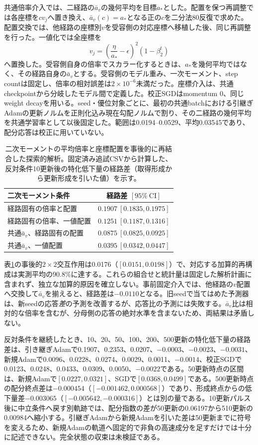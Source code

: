 共通倍率介入では、二経路の$\bar a_v$の幾何平均を目標$a_\ast$とした。配置を保つ再調整では各座標を$c v_j$へ置き換え、$\bar a_v(c)=a_\ast$となる正の$c$を二分法80反復で求めた。配置交換では、他経路の座標別$v$を受容側の対応座標へ移植した後、同じ再調整を行った。一値化では全座標を
\begin{equation}
v_j=\left(\frac{\eta}{a_\ast}-\epsilon\right)^2(1-\beta_2^t)
\end{equation}
へ置換した。受容側自身の倍率でスカラー化するときは、$a_\ast$を幾何平均ではなく、その経路自身の$\bar a_v$とする。受容側のモデル重み、一次モーメント、step countは固定し、倍率の相対誤差は$2\times10^{-6}$未満だった。座標介入は、共通checkpointから分岐したモデル間で定義した。校正SGDはmomentum 0、同じweight decayを用いる。seed・優位対象ごとに、最初の共通batchにおける引継ぎAdamの更新ノルムを正則化込み現在勾配ノルムで割り、その二経路の幾何平均を共通学習率として以後固定した。範囲は0.0194--0.0529、平均0.03545であり、配分応答は校正に用いていない。

\begin{table}[h]
\centering\small
\caption{二次モーメントの平均倍率と座標配置を事後的に再結合した探索的解析。固定済み追試CSVから計算した、反対条件10更新後の特化低下量の経路差（取得形成から更新形成を引いた値）を示す。}
\label{tab:vdecomp}
\begin{tabular}{lc}
\toprule
二次モーメント条件 & 経路差 $[95\%\ \mathrm{CI}]$\\
\midrule
経路固有の倍率と配置 & $0.1907\ [0.1835,0.1975]$\\
経路固有の倍率、一値配置 & $0.1251\ [0.1187,0.1316]$\\
共通$\bar a_v$、経路固有の配置 & $0.0875\ [0.0825,0.0925]$\\
共通$\bar a_v$、一値配置 & $0.0395\ [0.0342,0.0447]$\\
\bottomrule
\end{tabular}
\end{table}

表\ref{tab:vdecomp}の事後的$2\times2$交互作用は0.0176（$[0.0151,0.0198]$）で、対応する加算的再構成は実測平均の90.8\%に達する。これらの組合せと統計量は固定した解析計画に含まれず、独立な加算的原因を確立しない。事前固定介入では、他経路の$v$配置へ交換して$\bar a_v$を揃えると、経路差は$-0.0110$となる。旧seedで当てはめた予測器は、新seedの応答\emph{差}の予測を改善するが、応答比の予測には失敗する。$\bar a_v$比は相対的な倍率を含むが、分母側の応答の絶対水準を含まないため、両結果は矛盾しない。

反対条件を継続したとき、10、20、50、100、200、500更新の特化低下量の経路差は、引き継ぎAdamで0.1907、0.2353、0.0207、$-0.0003$、$-0.0023$、$-0.0031$、新規Adamで0.0096、0.0228、0.0274、0.0029、0.0011、$-0.0014$、校正SGDで0.0123、0.0248、0.0433、0.0309、0.0050、$-0.0022$である。50更新時点の区間は、新規Adamで$[0.0227,0.0321]$、SGDで$[0.0368,0.0499]$である。500更新時点の配分終点差は$-0.000454$（$[-0.001462,0.000568]$）であり、形成終点からの低下量差$-0.003065$（$[-0.005642,-0.000316]$）とは別の量である。10更新パルス後に中立条件へ戻す別軌跡では、配分指数の差が50更新の0.06197から510更新の0.00984へ縮小する。引継ぎAdamから新規Adamを引いた差は50更新までに符号を変えるため、新規Adamの軌道へ固定的で非負の高速成分を足すだけでは十分に記述できない。完全状態の収束は未検証である。

